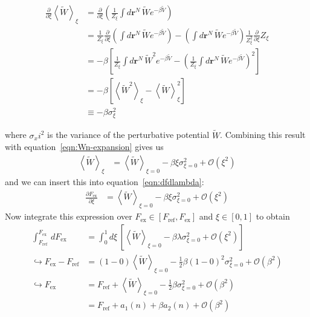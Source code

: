 \documentclass[letterpaper,twocolumn,amsmath,amssymb,prb]{revtex4-1}
\newcommand{\rr}{\ensuremath{\mathbf{r}}}
\newcommand{\Fex}{\ensuremath{F_\text{ex}}}
\newcommand{\Vtilde}{\ensuremath{\widetilde{V}}}
\newcommand{\Wtilde}{\ensuremath{\widetilde{W}}}
\begin{document}
\begin{widetext}
  \begin{align}
    \frac{\partial}{\partial\xi}\left\langle \Wtilde \right\rangle_{\xi} &= \frac{\partial}{\partial\xi}\left( \frac{1}{Z_\xi}\int d\rr^N\, \Wtilde e^{-\beta \Vtilde}\right) \nonumber \\
    &= \frac{1}{Z_\xi}\frac{\partial}{\partial\xi}\left( \int d\rr^N\, \Wtilde e^{-\beta \Vtilde} \right) - \left( \int d\rr^N\, \Wtilde e^{-\beta \Vtilde} \right)\frac{1}{Z_\xi^2}\frac{\partial}{\partial\xi}Z_\xi \nonumber \\
    &= -\beta\left[ \frac{1}{Z_\xi}\int d\rr^N\, \Wtilde^2e^{-\beta \Vtilde} - \left( \frac{1}{Z_\xi}\int d\rr^N\, \Wtilde e^{-\beta \Vtilde} \right)^2 \right] \nonumber \\
    &= -\beta\left[ \left\langle \Wtilde^2 \right\rangle_{\xi} - \left\langle \Wtilde \right\rangle_{\xi}^2 \right] \nonumber \\
    &\equiv -\beta\sigma_{\xi}^2
  \end{align}
\end{widetext}
where $\sigma_xi^2$ is the variance of the perturbative potential \Wtilde. Combining this result with equation~\ref{eqn:Wn-expansion} gives us
\begin{align}
  \left\langle \Wtilde \right\rangle_{\xi} &= \left\langle \Wtilde\right\rangle_{\xi = 0} - \beta\xi\sigma_{\xi=0}^2 + \mathcal{O}(\xi^2) \label{eqn:Wn-expansion-simplified}
\end{align}
and we can insert this into equation~\ref{eqn:dfdlambda}:
\begin{align}
  \frac{\partial \Fex}{\partial\xi} &= \left\langle \Wtilde\right\rangle_{\xi = 0} - \beta\xi\sigma_{\xi=0}^2 + \mathcal{O}(\xi^2)
\end{align}
Now integrate this expression over $\Fex\in[F_\text{ref},\Fex]$ and $\xi\in[0,1]$ to obtain
\begin{align}
  \int_{F_\text{ref}}^{\Fex}\, d\Fex &= \int_0^1 d\xi\, \left[ \left\langle \Wtilde\right\rangle_{\xi = 0} - \beta\lambda\sigma_{\xi=0}^2 + \mathcal{O}(\xi^2) \right] \nonumber \\
  \hookrightarrow \Fex - F_\text{ref} &= (1-0)\left\langle \Wtilde \right\rangle_{\xi=0} - \frac{1}{2}\beta(1 - 0)^2\sigma_{\xi=0}^2 + \mathcal{O}(\beta^2) \nonumber \\
  \hookrightarrow \Fex &= F_\text{ref} + \left\langle \Wtilde \right\rangle_{\xi=0} - \frac{1}{2}\beta\sigma_{\xi=0}^2 + \mathcal{O}(\beta^2) \label{eqn:F-inTermsW} \\
  &= F_\text{ref} + a_1(n) + \beta a_2(n) + \mathcal{O}(\beta^2) \label{eqn:hi-T-exp}
\end{align}
\end{document}
